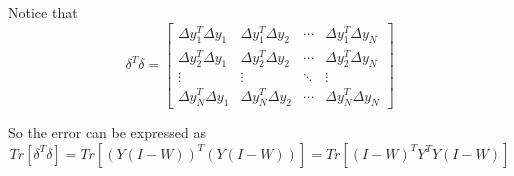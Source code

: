         Notice that
        \[ \delta^T\delta = \begin{bmatrix}
            \Delta y_1^T \Delta y_1 & \Delta y_1^T \Delta y_2 & \cdots & \Delta y_1^T \Delta y_N\\
            \Delta y_2^T \Delta y_1 & \Delta y_2^T \Delta y_2 & \cdots & \Delta y_2^T \Delta y_N\\
            \vdots & \vdots & \ddots & \vdots\\
            \Delta y_N^T \Delta y_1 & \Delta y_N^T \Delta y_2 & \cdots & \Delta y_N^T \Delta y_N
        \end{bmatrix} \]

        So the error can be expressed as
        \[ Tr[\delta^T\delta] = Tr[(Y(I-W))^T(Y(I-W))] = Tr[(I-W)^TY^TY(I-W)] \]
